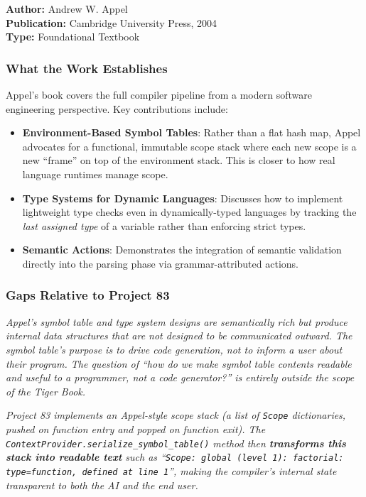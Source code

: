 \documentclass[a4paper,11pt]{article}
\newcommand{\papergap}[1]{%
  \begin{tcolorbox}[colback=red!5!white, colframe=red!60!black, title={Research Gap Identified}]
  \textit{#1}
  \end{tcolorbox}
}
\newcommand{\oursolution}[1]{%
  \begin{tcolorbox}[colback=green!5!white, colframe=green!60!black, title={How Project 83 Solves This Gap}]
  \textit{#1}
  \end{tcolorbox}
}
\begin{document}
\begin{tcolorbox}[colback=gray!5, colframe=gray!40]
\textbf{Author:} Andrew W. Appel \\
\textbf{Publication:} Cambridge University Press, 2004 \\
\textbf{Type:} Foundational Textbook
\end{tcolorbox}

\subsubsection{What the Work Establishes}

Appel's book covers the full compiler pipeline from a modern software engineering perspective. Key contributions include:
\begin{itemize}
    \item \textbf{Environment-Based Symbol Tables}: Rather than a flat hash map, Appel advocates for a functional, immutable scope stack where each new scope is a new ``frame'' on top of the environment stack. This is closer to how real language runtimes manage scope.
    \item \textbf{Type Systems for Dynamic Languages}: Discusses how to implement lightweight type checks even in dynamically-typed languages by tracking the \textit{last assigned type} of a variable rather than enforcing strict types.
    \item \textbf{Semantic Actions}: Demonstrates the integration of semantic validation directly into the parsing phase via grammar-attributed actions.
\end{itemize}

\subsubsection{Gaps Relative to Project 83}

\papergap{Appel's symbol table and type system designs are semantically rich but produce internal data structures that are not designed to be communicated outward. The symbol table's purpose is to drive code generation, not to inform a user about their program. The question of ``how do we make symbol table contents readable and useful to a programmer, not a code generator?'' is entirely outside the scope of the Tiger Book.}

\oursolution{Project 83 implements an Appel-style scope stack (a list of \texttt{Scope} dictionaries, pushed on function entry and popped on function exit). The \texttt{ContextProvider.serialize\_symbol\_table()} method then \textbf{transforms this stack into readable text} such as ``\texttt{Scope: global (level 1): factorial: type=function, defined at line 1}'', making the compiler's internal state transparent to both the AI and the end user.}
\end{document}
